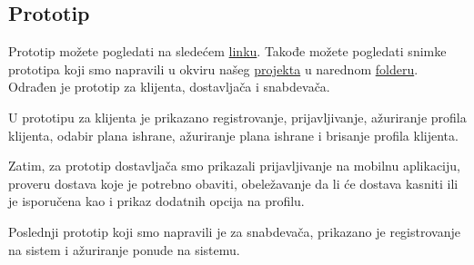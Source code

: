 \subsection{Prototip}

Prototip  možete pogledati na sledećem \href{https://www.figma.com/file/9DzJEykE8ewLe1hKCfsNp7/Food-Delivery-UI-(Community)?node-id=146%3A1788}{linku}. Takođe možete pogledati snimke prototipa koji smo napravili u okviru našeg \href{https://github.com/AnaNika10/IS-ChooseFresh}{projekta} u narednom \href{https://github.com/AnaNika10/IS-ChooseFresh/tree/main/Prototype}{folderu}.
Odrađen je prototip za klijenta, dostavljača i snabdevača.

U prototipu za klijenta je prikazano registrovanje, prijavljivanje, ažuriranje profila klijenta, odabir plana ishrane, ažuriranje plana ishrane i brisanje profila klijenta.

Zatim, za prototip dostavljača smo prikazali prijavljivanje na mobilnu aplikaciju, proveru dostava koje je potrebno obaviti, obeležavanje da li će dostava kasniti ili je isporučena kao i prikaz dodatnih opcija na profilu.

Poslednji prototip koji smo napravili je za snabdevača, prikazano je registrovanje na sistem i ažuriranje ponude na sistemu.

